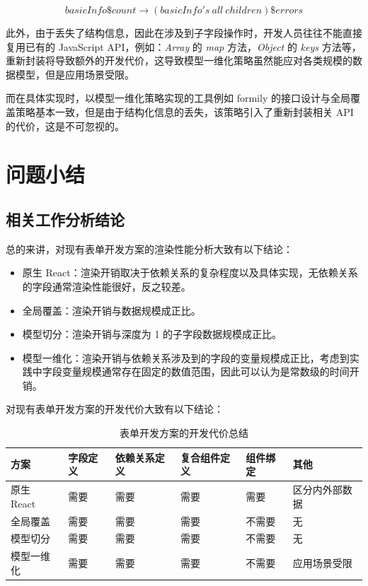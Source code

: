 \documentclass[winfonts,master,twoside]{njuthesis}
\begin{document}
$$basicInfo\$count \rightarrow (basicInfo's\ all\ children)\$errors$$

此外，由于丢失了结构信息，因此在涉及到子字段操作时，开发人员往往不能直接复用已有的 JavaScript API，例如：\textit{Array} 的 \textit{map} 方法，\textit{Object} 的 \textit{keys} 方法等，重新封装将导致额外的开发代价，这导致模型一维化策略虽然能应对各类规模的数据模型，但是应用场景受限。

而在具体实现时，以模型一维化策略实现的工具例如 formily 的接口设计与全局覆盖策略基本一致，但是由于结构化信息的丢失，该策略引入了重新封装相关 API 的代价，这是不可忽视的。

\section{问题小结}\label{problem-summary}

\subsection{相关工作分析结论}

总的来讲，对现有表单开发方案的渲染性能分析大致有以下结论：

\begin{itemize}
    \item 原生 React：渲染开销取决于依赖关系的复杂程度以及具体实现，无依赖关系的字段通常渲染性能很好，反之较差。
    \item 全局覆盖：渲染开销与数据规模成正比。
    \item 模型切分：渲染开销与深度为 1 的子字段数据规模成正比。
    \item 模型一维化：渲染开销与依赖关系涉及到的字段的变量规模成正比，考虑到实践中字段变量规模通常存在固定的数值范围，因此可以认为是常数级的时间开销。
\end{itemize}

对现有表单开发方案的开发代价大致有以下结论：

\begin{table}[h]
    \centering
    \small
    \begin{tabular}{|l|l|l|l|l|l|}
        \hline
        方案       & 字段定义 & 依赖关系定义 & 复合组件定义 & 组件绑定 & 其他           \\ \hline
        原生 React & 需要     & 需要         & 需要         & 需要     & 区分内外部数据 \\ \hline
        全局覆盖   & 需要     & 需要         & 需要         & 不需要   & 无             \\ \hline
        模型切分   & 需要     & 需要         & 需要         & 不需要   & 无             \\ \hline
        模型一维化 & 需要     & 需要         & 需要         & 不需要   & 应用场景受限   \\ \hline
    \end{tabular}
    \normalsize
    \caption{表单开发方案的开发代价总结}
\end{table}
\end{document}
